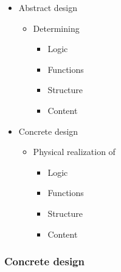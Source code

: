 \begin{itemize}
	\item Abstract design
	\begin{itemize}
		\item Determining
		\begin{itemize}
			\item Logic
			\item Functions
			\item Structure
			\item Content
		\end{itemize}
	\end{itemize}
	\item Concrete design
	\begin{itemize}
		\item Physical realization of
		\begin{itemize}
			\item Logic
			\item Functions
			\item Structure
			\item Content
		\end{itemize}
	\end{itemize}
\end{itemize}
\subsubsection{Concrete design}
